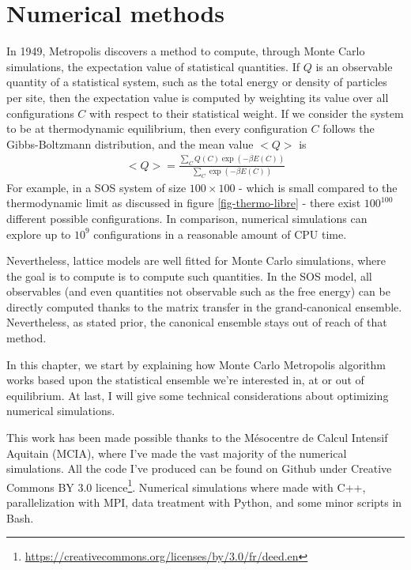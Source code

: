 \chapter{Numerical methods}
\label{chap-sim}

In 1949, Metropolis \cite{metropolis_monte_1949} discovers a method to compute, through Monte Carlo simulations, the expectation value of statistical quantities. If $Q$ is an observable quantity of a statistical system, such as the total energy or density of particles per site, then the expectation value is computed by weighting its value over all configurations $C$ with respect to their statistical weight. If we consider the system to be at thermodynamic equilibrium, then every configuration $C$ follows the Gibbs-Boltzmann distribution, and the mean value $<Q>$ is
\begin{align}
    <Q> = \frac{\sum_{C} Q(C) \exp(-\beta E(C))}{\sum_{C} \exp(-\beta E(C))}
\end{align}
For example, in a SOS system of size $100\times100$ - which is small compared to the thermodynamic limit as discussed in figure \ref{fig-thermo-libre} - there exist $100^{100}$ different possible configurations. In comparison, numerical simulations can explore up to $10^9$ configurations in a reasonable amount of CPU time.

Nevertheless, lattice models are well fitted for Monte Carlo simulations, where the goal is to compute is to compute such quantities. In the SOS model, all observables (and even quantities not observable such as the free energy) can be directly computed thanks to the matrix transfer in the grand-canonical ensemble. Nevertheless, as stated prior, the canonical ensemble stays out of reach of that method.

In this chapter, we start by explaining how Monte Carlo Metropolis algorithm works based upon the statistical ensemble we're interested in, at or out of equilibrium.
At last, I will give some technical considerations about optimizing numerical simulations.

This work has been made possible thanks to the Mésocentre de Calcul Intensif Aquitain (MCIA)\cite{noauthor_mesocentre_nodate}, where I've made the vast majority of the numerical simulations.
All the code I've produced can be found on Github \cite{paul_gersberg_github_2020} under Creative Commons BY 3.0 licence\footnote{\url{https://creativecommons.org/licenses/by/3.0/fr/deed.en}}. Numerical simulations where made with C++, parallelization with MPI, data treatment with Python, and some minor scripts in Bash.

